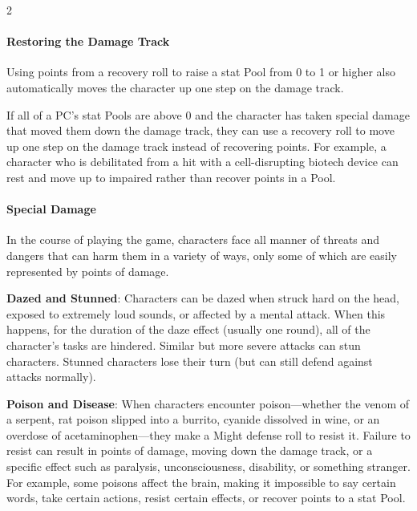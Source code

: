 \begin{multicols}{2}

\paragraph{Restoring the Damage Track}

Using points from a recovery roll to raise a stat Pool from 0 to 1 or higher also automatically moves the character up one step on the damage track.

If all of a PC’s stat Pools are above 0 and the character has taken special damage that moved them down the damage track, they can use a recovery roll to move up one step on the damage track instead of recovering points. For example, a character who is debilitated from a hit with a
cell-disrupting biotech device can rest and move up to impaired rather than recover points in a Pool.

\paragraph{Special Damage}

In the course of playing the game, characters face all manner of threats and dangers that can harm them in a variety of ways, only some of which are easily represented by points of damage.

\textbf{Dazed and Stunned}: Characters can be dazed when struck hard on the head, exposed to extremely loud sounds, or affected by a mental attack. When this happens, for the duration of the daze effect (usually one round), all of the character’s tasks are hindered. Similar but more severe attacks can stun characters. Stunned characters lose their turn (but can still defend against attacks normally).

\textbf{Poison and Disease}: When characters encounter poison—whether the venom of a serpent, rat poison slipped into a burrito, cyanide dissolved in wine, or an overdose of acetaminophen—they make a Might defense roll to resist it. Failure to resist can result in points of damage, moving down the damage track, or a specific effect such as paralysis, unconsciousness, disability, or something stranger. For example, some poisons affect the brain, making it impossible to say certain words, take certain actions, resist certain effects, or recover points to a stat Pool.


\end{multicols}
